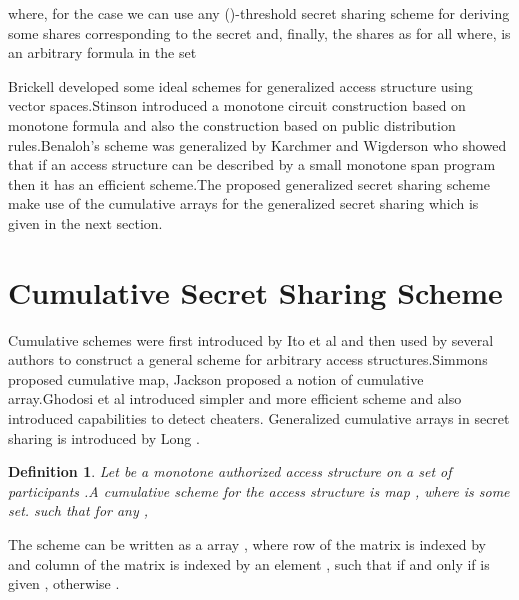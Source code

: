 \documentclass{llncs}
\newtheorem{defn}{Definition}
\begin{document}
where, for the case  we can use any ()-threshold secret sharing scheme for deriving some shares  corresponding to the secret  and, finally, the shares as  for all \mbox{} where,  is an arbitrary formula in the set 

Brickell \cite{brickell1991classification}developed some ideal schemes for generalized access structure using vector spaces.Stinson \cite{stinson1992explication} introduced a monotone circuit construction based on monotone formula and also the construction based on public distribution rules.Benaloh's scheme was generalized by Karchmer and Wigderson \cite{karchmer1993span}who showed that if an access structure can be described by a small monotone span program then it has an efficient scheme.The proposed generalized secret sharing scheme make use of the cumulative arrays for the generalized secret sharing which is given in the next section.

\section {Cumulative Secret Sharing Scheme}
      
Cumulative schemes were first introduced by Ito et al \cite{ito1989secret} and then used by several authors to construct a general scheme for arbitrary access structures.Simmons \cite{simmons1992} proposed cumulative map, Jackson \cite{jackson1993cumulative} proposed a notion of cumulative array.Ghodosi et al \cite{ghodosi1998construction} introduced simpler and more efficient scheme and also introduced capabilities to detect cheaters. 
Generalized cumulative arrays in secret sharing is introduced by Long \cite{long2006generalised}.
 \begin{defn} 
      Let  be a monotone authorized access structure on a set of participants .A cumulative scheme for the access structure  is map , where  is some set. such that for any ,
       
 \end{defn}
      
The scheme can be written as a  array , where row  of the matrix  is indexed by  and column  of the matrix  is indexed by an element , such that  if and only if  is given , otherwise .
\end{document}
